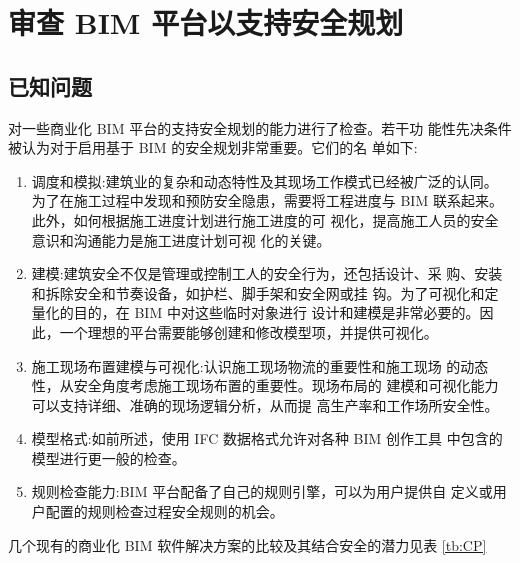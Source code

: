 \section{审查 BIM 平台以支持安全规划}
\subsection{已知问题}
对一些商业化 BIM 平台的支持安全规划的能力进行了检查。若干功
能性先决条件被认为对于启用基于 BIM 的安全规划非常重要。它们的名
单如下:

\begin{enumerate}
    \item 调度和模拟:建筑业的复杂和动态特性及其现场工作模式已经被广泛的认同。
    为了在施工过程中发现和预防安全隐患，需要将工程进度与
    BIM 联系起来。此外，如何根据施工进度计划进行施工进度的可
    视化，提高施工人员的安全意识和沟通能力是施工进度计划可视
    化的关键。    
    \item 建模:建筑安全不仅是管理或控制工人的安全行为，还包括设计、采
    购、安装和拆除安全和节奏设备，如护栏、脚手架和安全网或挂
    钩。为了可视化和定量化的目的，在 BIM 中对这些临时对象进行
    设计和建模是非常必要的。因此，一个理想的平台需要能够创建和修改模型项，并提供可视化。
    \item 施工现场布置建模与可视化:认识施工现场物流的重要性和施工现场
    的动态性，从安全角度考虑施工现场布置的重要性。现场布局的
    建模和可视化能力可以支持详细、准确的现场逻辑分析，从而提
    高生产率和工作场所安全性。
    \item 模型格式:如前所述，使用 IFC 数据格式允许对各种 BIM 创作工具
    中包含的模型进行更一般的检查。
    \item 规则检查能力:BIM 平台配备了自己的规则引擎，可以为用户提供自
    定义或用户配置的规则检查过程安全规则的机会。
\end{enumerate}


几个现有的商业化 BIM 软件解决方案的比较及其结合安全的潜力见表 \ref{tb:CP}

